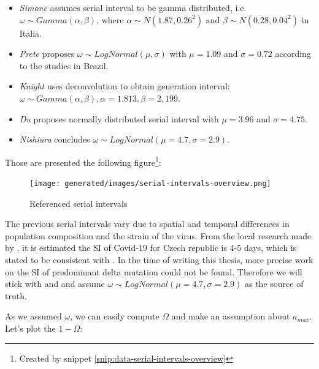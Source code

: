 \documentclass[
  digital, %
  oneside, %
  lof,     %
  lot,     %
]{fithesis4}
\begin{document}
\begin{itemize}
  \item \textit{Simone} \cite{simone2020} assumes serial interval to be gamma 
  distributed, i.e. $\omega \sim Gamma(\alpha,\beta)$, where 
  $\alpha \sim N \left( 1.87, 0.26^2 \right)$ and 
  $\beta \sim N \left( 0.28, 0.04^2 \right)$ in Italia.

  \item \textit{Prete} \cite{prete2020} proposes $\omega \sim LogNormal(\mu, \sigma)$ 
  with $\mu = 1.09$ and $\sigma = 0.72$ according to the 
  studies in Brazil.

  \item \textit{Knight} \cite{knight2020} uses deconvolution 
  to obtain generation interval: $\omega \sim Gamma(\alpha, \beta), \alpha = 1.813, \beta = 2,199$.

  \item \textit{Du} \cite{du2020} proposes normally distributed serial 
  interval with $\mu = 3.96$ and $\sigma = 4.75$.

  \item \textit{Nishiura} \cite{nishiura2020} concludes 
  $\omega \sim LogNormal \left( \mu = 4.7, \sigma = 2.9 \right)$.
\end{itemize}

Those are presented the following figure\footnote{Created by snippet \ref{snip:data-serial-intervals-overview}}:

\begin{figure}[H]
  \begin{center}
    \texttt{[image: generated/images/serial-intervals-overview.png]}
  \end{center}
  \caption{Referenced serial intervals}
  \label{fig:serial-intervals-overview}
\end{figure}

The previous serial intervals vary due to spatial and temporal differences in population composition and the strain of the virus.
From the local research made by \cite{majek2020}, it is estimated the SI of Covid-19 for Czech republic is 4-5 days, which is stated to be consistent with \cite{nishiura2020}. 
In the time of writing this thesis, more precise work on the SI of predominant delta mutation could not be found. 
Therefore we will stick with \cite{majek2020} and \cite{nishiura2020} and assume $\omega \sim LogNormal \left( \mu = 4.7, \sigma = 2.9 \right)$ as the source of truth.

As we assumed $\omega$, we can easily compute $\Omega$ and make an assumption about $a_{max}$.
Let's plot the $1 - \Omega$:
\end{document}
